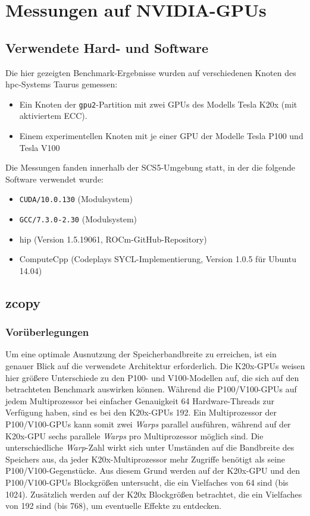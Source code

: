 \section{Messungen auf NVIDIA-GPUs}
\label{nvidia}

\subsection{Verwendete Hard- und Software}

Die hier gezeigten Benchmark-Ergebnisse wurden auf verschiedenen Knoten des
\gls{hpc}-Systems Taurus gemessen:

\begin{itemize}
    \item Ein Knoten der \texttt{gpu2}-Partition mit zwei GPUs des Modells Tesla
          K20x (mit aktiviertem ECC).
    \item Einem experimentellen Knoten mit je einer GPU der Modelle Tesla P100
          und Tesla V100
\end{itemize}

Die Messungen fanden innerhalb der SCS5-Umgebung statt, in der die folgende
Software verwendet wurde:

\begin{itemize}
    \item \texttt{CUDA/10.0.130} (Modulsystem)
    \item \texttt{GCC/7.3.0-2.30} (Modulsystem)
    \item \gls{hip} (Version 1.5.19061, ROCm-GitHub-Repository)
    \item ComputeCpp (Codeplays SYCL-Implementierung, Version 1.0.5 für Ubuntu
          14.04)
\end{itemize}

\subsection{zcopy}

\subsubsection{Vorüberlegungen}

Um eine optimale Ausnutzung der Speicherbandbreite zu erreichen, ist ein genauer
Blick auf die verwendete Architektur erforderlich. Die K20x-GPUs weisen hier
größere Unterschiede zu den P100- und V100-Modellen auf, die sich auf den
betrachteten Benchmark auswirken können. Während die P100/V100-GPUs auf jedem
Multiprozessor bei einfacher Genauigkeit \num{64} Hardware-Threads zur Verfügung
haben, sind es bei den K20x-GPUs \num{192}. Ein Multiprozessor der
P100/V100-GPUs kann somit zwei \textit{Warps} parallel ausführen, während auf
der K20x-GPU sechs parallele \textit{Warps} pro Multiprozessor möglich sind. Die
unterschiedliche \textit{Warp}-Zahl wirkt sich unter Umständen auf die
Bandbreite des Speichers aus, da jeder K20x-Multiprozessor mehr Zugriffe
benötigt als seine P100/V100-Gegenstücke. Aus diesem Grund werden auf der
K20x-GPU und den P100/V100-GPUs Blockgrößen untersucht, die ein Vielfaches von
\num{64} sind (bis \num{1024}). Zusätzlich werden auf der K20x Blockgrößen
betrachtet, die ein Vielfaches von \num{192} sind (bis \num{768}), um eventuelle
Effekte zu entdecken.

